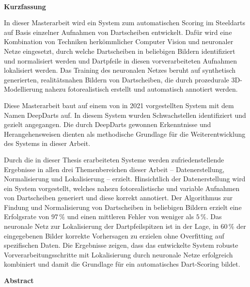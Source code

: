 
\mbox{~}
\newpage

\vspace*{2.17cm}

{\noindent\Huge\textbf{Kurzfassung}}

\vspace*{1.405cm}

\noindent In dieser Masterarbeit wird ein System zum automatischen Scoring im Steeldarts auf Basis einzelner Aufnahmen von Dartscheiben entwickelt. Dafür wird eine Kombination von Techniken herkömmlicher Computer Vision und neuronaler Netze eingesetzt, durch welche Dartscheiben in beliebigen Bildern identifiziert und normalisiert werden und Dartpfeile in diesen vorverarbeiteten Aufnahmen lokalisiert werden. Das Training des neuronalen Netzes beruht auf synthetisch generierten, realitätsnahen Bildern von Dartscheiben, die durch prozedurale 3D-Modellierung nahezu fotorealistisch erstellt und automatisch annotiert werden.

Diese Masterarbeit baut auf einem von \citeauthor{deepdarts} in 2021 vorgestellten System mit dem Namen DeepDarts auf. In diesem System wurden Schwachstellen identifiziert und gezielt angegangen. Die durch DeepDarts gewonnen Erkenntnisse und Herangehensweisen dienten als methodische Grundlage für die Weiterentwicklung des Systems in dieser Arbeit.

Durch die in dieser Thesis erarbeiteten Systeme werden zufriedenstellende Ergebnisse in allen drei Themenbereichen dieser Arbeit -- Datenerstellung, Normalisierung und Lokalisierung -- erzielt. Hinsichtlich der Datenerstellung wird ein System vorgestellt, welches nahezu fotorealistische und variable Aufnahmen von Dartscheiben generiert und diese korrekt annotiert. Der Algorithmus zur Findung und Normalisierung von Dartscheiben in beliebigen Bildern erzielt eine Erfolgsrate von $97\,\%$ und einen mittleren Fehler von weniger als $5\,\%$. Das neuronale Netz zur Lokalisierung der Dartpfeilspitzen ist in der Lage, in $60\,\%$ der eingegebenen Bilder korrekte Vorhersagen zu erzielen ohne Overfitting auf spezifischen Daten. Die Ergebnisse zeigen, dass das entwickelte System robuste Vorverarbeitungsschritte mit Lokalisierung durch neuronale Netze erfolgreich kombiniert und damit die Grundlage für ein automatisches Dart-Scoring bildet.

\newpage

\vspace*{2.17cm}

{\noindent\Huge\textbf{Abstract}}


